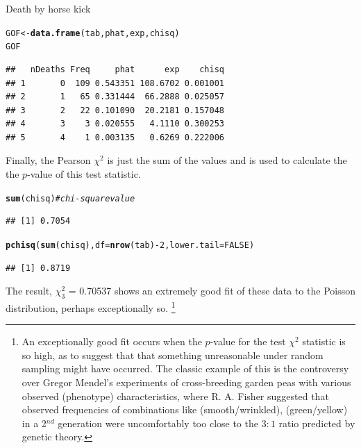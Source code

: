 \documentclass[11pt]{book}\usepackage[]{graphicx}\usepackage[]{color}
\makeatletter
\newcommand{\hlnum}[1]{\textcolor[rgb]{0.686,0.059,0.569}{#1}}%
\newcommand{\hlcom}[1]{\textcolor[rgb]{0.678,0.584,0.686}{\textit{#1}}}%
\newcommand{\hlopt}[1]{\textcolor[rgb]{0,0,0}{#1}}%
\newcommand{\hlstd}[1]{\textcolor[rgb]{0.345,0.345,0.345}{#1}}%
\newcommand{\hlkwb}[1]{\textcolor[rgb]{0.69,0.353,0.396}{#1}}%
\newcommand{\hlkwc}[1]{\textcolor[rgb]{0.333,0.667,0.333}{#1}}%
\newcommand{\hlkwd}[1]{\textcolor[rgb]{0.737,0.353,0.396}{\textbf{#1}}}%
\newenvironment{kframe}{%
 \def\at@end@of@kframe{}%
 \ifinner\ifhmode%
  \def\at@end@of@kframe{\end{minipage}}%
  \begin{minipage}{\columnwidth}%
 \fi\fi%
 \def\FrameCommand##1{\hskip\@totalleftmargin \hskip-\fboxsep
 \colorbox{shadecolor}{##1}\hskip-\fboxsep
     \hskip-\linewidth \hskip-\@totalleftmargin \hskip\columnwidth}%
 \MakeFramed {\advance\hsize-\width
   \@totalleftmargin\z@ \linewidth\hsize
   \@setminipage}}%
 {\par\unskip\endMakeFramed%
 \at@end@of@kframe}
\newenvironment{knitrout}{}{} %
\renewenvironment{knitrout}{\small\renewcommand{\baselinestretch}{.85}}{} %
\makeatother
\begin{document}
\begin{Example}[horsekick3]{Death by horse kick}
\begin{knitrout}
\begin{kframe}
\begin{alltt}
\hlstd{GOF} \hlkwb{<-} \hlkwd{data.frame}\hlstd{(tab, phat, exp, chisq)}
\hlstd{GOF}
\end{alltt}
\begin{verbatim}
##   nDeaths Freq     phat      exp    chisq
## 1       0  109 0.543351 108.6702 0.001001
## 2       1   65 0.331444  66.2888 0.025057
## 3       2   22 0.101090  20.2181 0.157048
## 4       3    3 0.020555   4.1110 0.300253
## 5       4    1 0.003135   0.6269 0.222006
\end{verbatim}
\end{kframe}
\end{knitrout}

Finally, the Pearson $\chi^2$ is just the sum of the 
values and  is used to calculate the the
$p$-value of this test statistic.

\begin{knitrout}
\color{fgcolor}\begin{kframe}
\begin{alltt}
\hlkwd{sum}\hlstd{(chisq)}  \hlcom{# chi-square value}
\end{alltt}
\begin{verbatim}
## [1] 0.7054
\end{verbatim}
\begin{alltt}
\hlkwd{pchisq}\hlstd{(}\hlkwd{sum}\hlstd{(chisq),} \hlkwc{df}\hlstd{=}\hlkwd{nrow}\hlstd{(tab)}\hlopt{-}\hlnum{2}\hlstd{,} \hlkwc{lower.tail}\hlstd{=}\hlnum{FALSE}\hlstd{)}
\end{alltt}
\begin{verbatim}
## [1] 0.8719
\end{verbatim}
\end{kframe}
\end{knitrout}

The result, $\chi^2_3$ = 0.70537 shows an 
extremely good fit of these data to the Poisson distribution,
perhaps exceptionally so.%
\footnote{
An exceptionally good fit occurs when the $p$-value for
the test $\chi^2$ statistic is so high, as to suggest that
that something unreasonable under random sampling might have
occurred.  The classic example of this is the 
controversy over Gregor Mendel's experiments of cross-breeding
garden peas with various observed (phenotype) characteristics,
where R. A. Fisher \citeyear{Fisher:1936:Mendel} suggested that
observed frequencies of combinations like (smooth/wrinkled),
(green/yellow) in a 2$^{nd}$ generation were uncomfortably too
close to the $3:1$ ratio predicted by genetic theory.  
}

\end{Example}
\end{document}
